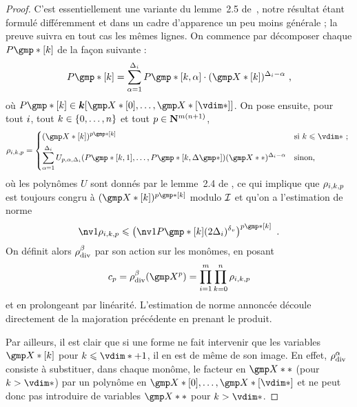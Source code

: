 \begin{proof}
  C'est essentiellement une variante du lemme~2.5 de~\cite{remivg}, notre
  résultat étant formulé différemment et dans un cadre d'apparence un peu
  moins générale ; la preuve suivra en tout cas les mêmes lignes. On commence
  par décomposer chaque \( P\mexp*[\ind] \) de la façon suivante :
  \begin{equation}
    P\mexp*[\ind]
    =
    \sum _{\alpha=1}^{\Delta_\fct}
    P\mexp*[\ind, \alpha] \cdot (\vmp*[\ind])^{\Delta_\fct - \alpha}
    \pmm,
  \end{equation}
  où \( P\mexp*[\ind] \in \cdn [ \vmp*[0], \dots, \vmp*[\vdim*] ] \).
  On pose ensuite, pour tout \( i \), tout
  \( k \in \{ 0, \dots, n \} \) et tout
  \( p \in {\mathbf{N}}^{m(n+1)} \),
  \begin{equation}
    \rho_{\fct, \ind, p}
    =
    \begin{dcases*}
      ( \vmp*[\ind] ) ^{p\mexp*[\ind]}
      & si \( \ind \le \vdim* \) ;
      \\
      \sum _{\alpha=1}^{\Delta_\fct}
      U_{p, \alpha, \Delta_\fct}
      ( P\mexp*[\ind, 1], \dots, P\mexp*[\ind, \Delta\mexp*] )
      (\vmp**)^{\Delta_\fct - \alpha}
      & sinon,
    \end{dcases*}
  \end{equation}
  où les polynômes \( U \) sont donnés par le lemme~2.4 de \cite{remivg}, ce
  qui implique que \( \rho_{i, k, p} \) est toujours congru à
  \( ( \vmp*[\ind] ) ^{p\mexp*[\ind]} \) modulo \( \mathcal I \) et qu'on a
  l'estimation de norme
  \begin{equation}
    \nv1{ \rho_{\fct, \ind, p} }
    \le
    \left(
    \nv1{ P\mexp*[\ind] } (2\Delta_\fct)^\dv
    \right) ^{p\mexp*[\ind]}
    \pmm.
  \end{equation}
  On définit alors \( \rho\sb{\mathrm{div }}^\beta \) par son action sur les monômes, en posant
  \begin{equation}
    c_p
    = \rdiv^\beta(\vmp^p)
    = \prod\fctrange \prod\indrange \rho_{\fct, \ind, p}
  \end{equation}
  et en prolongeant par linéarité. L'estimation de norme annoncée découle
  directement de la majoration précédente en prenant le produit.
  
  Par ailleurs, il est clair que si une forme ne fait intervenir que les
  variables \( \vmp*[\ind] \) pour \( \ind \le \vdim* + 1 \), il en est de
  même de son image. En effet, \( \rho\sb{\mathrm{div }}^\alpha \) consiste à substituer, dans
  chaque monôme, le facteur en \( \vmp** \) (pour \( \ind > \vdim* \)) par un
  polynôme en \( \vmp*[0], \dots, \vmp*[\vdim*] \) et ne peut donc pas
  introduire de variables \( \vmp** \) pour \( \ind > \vdim* \).
\end{proof}


